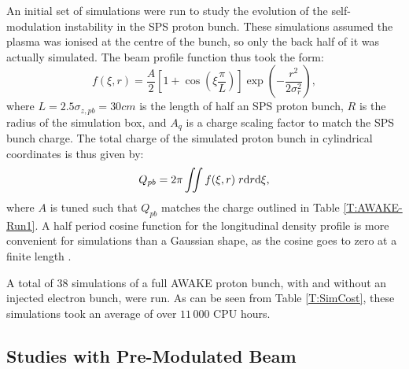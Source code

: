 An initial set of simulations were run to study the evolution of the self-modulation instability in the SPS proton bunch.
These simulations assumed the plasma was ionised at the centre of the bunch, so only the back half of it was actually simulated.
The beam profile function thus took the form:
\begin{equation}
    f(\xi,r) = \frac{A}{2} \left[1 + \cos\left(\xi\frac{\pi}{L}\right)\right] \exp\left(-\frac{r^{2}}{2\sigma_{r}^{2}}\right), \label{EQ:SPS-Profile}
\end{equation}
where $L = 2.5\sigma_{z,pb} = 30\unit{cm}$ is the length of half an SPS proton bunch, $R$ is the radius of the simulation box, and $A_{q}$ is a charge scaling factor to match the SPS bunch charge.
The total charge of the simulated proton bunch in cylindrical coordinates is thus given by:
\begin{equation}
    Q_{pb} = 2\pi \iint f(\xi,r) \;r \mathrm{d} r \mathrm{d} \xi, \label{EQ:SPS-Charge}
\end{equation}
where $A$ is tuned such that $Q_{pb}$ matches the charge outlined in Table \ref{T:AWAKE-Run1}.
A half period cosine function for the longitudinal density profile is more convenient for simulations than a Gaussian shape, as the cosine goes to zero at a finite length \cite{lotov:2010}.

A total of $38$ simulations of a full AWAKE proton bunch, with and without an injected electron bunch, were run.
As can be seen from Table \ref{T:SimCost}, these simulations took an average of over $11\,000$ CPU hours.



\subsection{Studies with Pre-Modulated Beam}
\label{Sim:PBPreMod}

